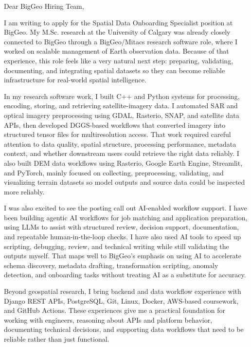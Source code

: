 \documentclass[11pt]{letter}
\begin{document}
\begin{letter}{}

\opening{Dear BigGeo Hiring Team,}

I am writing to apply for the Spatial Data Onboarding Specialist position at BigGeo. My M.Sc. research at the University of Calgary was already closely connected to BigGeo through a BigGeo/Mitacs research software role, where I worked on scalable management of Earth observation data. Because of that experience, this role feels like a very natural next step: preparing, validating, documenting, and integrating spatial datasets so they can become reliable infrastructure for real-world spatial intelligence.

In my research software work, I built C++ and Python systems for processing, encoding, storing, and retrieving satellite-imagery data. I automated SAR and optical imagery preprocessing using GDAL, Rasterio, SNAP, and satellite data APIs, then developed DGGS-based workflows that converted imagery into structured tensor files for multiresolution access. That work required careful attention to data quality, spatial structure, processing performance, metadata context, and whether downstream users could retrieve the right data reliably. I also built DEM data workflows using Rasterio, Google Earth Engine, Streamlit, and PyTorch, mainly focused on collecting, preprocessing, validating, and visualizing terrain datasets so model outputs and source data could be inspected more reliably.

I was also excited to see the posting call out AI-enabled workflow support. I have been building agentic AI workflows for job matching and application preparation, using LLMs to assist with structured review, decision support, documentation, and repeatable human-in-the-loop checks. I have also used AI tools to speed up scripting, debugging, review, and technical writing while still validating the outputs myself. That maps well to BigGeo's emphasis on using AI to accelerate schema discovery, metadata drafting, transformation scripting, anomaly detection, and onboarding tasks without treating AI as a substitute for accuracy.

Beyond geospatial research, I bring backend and data workflow experience with Django REST APIs, PostgreSQL, Git, Linux, Docker, AWS-based coursework, and GitHub Actions. These experiences give me a practical foundation for working with engineers, reasoning about APIs and platform behavior, documenting technical decisions, and supporting data workflows that need to be reliable rather than just functional.


\end{letter}
\end{document}
